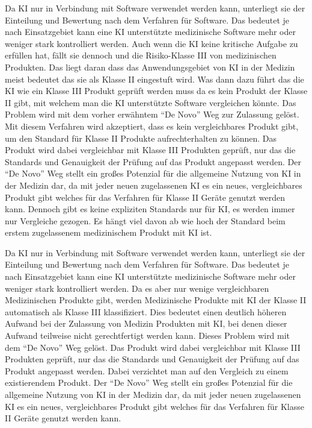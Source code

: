 Da KI nur in Verbindung mit Software verwendet werden kann, unterliegt sie der Einteilung und Bewertung nach dem Verfahren für Software. Das bedeutet je nach Einsatzgebiet kann eine KI unterstützte medizinische Software mehr oder weniger stark kontrolliert werden.
Auch wenn die KI keine kritische Aufgabe zu erfüllen hat, fällt sie dennoch und die Risiko-Klasse III von medizinischen Produkten. Das liegt daran dass das Anwendungsgebiet von KI in der Medizin meist bedeutet das sie als Klasse II eingestuft wird. Was dann dazu führt das die KI wie ein Klasse III Produkt geprüft werden muss da es kein Produkt der Klasse II gibt, mit welchem man die KI unterstützte Software vergleichen könnte. Das Problem wird mit dem vorher erwähntem "`De Novo"' Weg zur Zulassung gelöst. 
Mit diesem Verfahren wird akzeptiert, dass es kein vergleichbares Produkt gibt, um den Standard für Klasse II Produkte aufrechterhalten zu können. Das Produkt wird dabei vergleichbar mit Klasse III Produkten geprüft, nur das die Standards und Genauigkeit der Prüfung auf das Produkt angepasst werden. Der "`De Novo"' Weg stellt ein großes Potenzial für die allgemeine Nutzung von KI in der Medizin dar, da mit jeder neuen zugelassenen KI es ein neues, vergleichbares Produkt gibt welches für das Verfahren für Klasse II Geräte genutzt werden kann. Dennoch gibt es keine expliziten Standards nur für KI, es werden immer nur Vergleiche gezogen. Es hängt viel davon ab wie hoch der Standard beim erstem zugelassenem medizinischem Produkt mit KI ist. \cite{usa_ai_approval}

Da KI nur in Verbindung mit Software verwendet werden kann, unterliegt sie der Einteilung und Bewertung nach dem Verfahren für Software. Das bedeutet je nach Einsatzgebiet kann eine KI unterstützte medizinische Software mehr oder weniger stark kontrolliert werden. Da es aber nur wenige vergleichbaren Medizinischen Produkte gibt, werden Medizinische Produkte mit KI der Klasse II automatisch als Klasse III klassifiziert. Dies bedeutet einen deutlich höheren Aufwand bei der Zulassung von Medizin Produkten mit KI, bei denen dieser Aufwand teilweise nicht gerechtfertigt werden kann.
Dieses Problem wird mit dem "`De Novo"' Weg gelöst. Das Produkt wird dabei vergleichbar mit Klasse III Produkten geprüft, nur das die Standards und Genauigkeit der Prüfung auf das Produkt angepasst werden. Dabei verzichtet man auf den Vergleich zu einem existierendem Produkt. Der "`De Novo"' Weg stellt ein großes Potenzial für die allgemeine Nutzung von KI in der Medizin dar, da mit jeder neuen zugelassenen KI es ein neues, vergleichbares Produkt gibt welches für das Verfahren für Klasse II Geräte genutzt werden kann.\cite{usa_ai_approval}